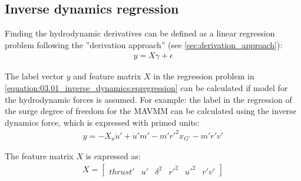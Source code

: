 \subsection{Inverse dynamics regression} \label{sec:IDR}
Finding the hydrodynamic derivatives can be defined as a linear regression problem following the ''derivation approach'' (see \autoref{sec:derivation_approach}):
\begin{equation}\label{equation:03.01_inverse_dynamics:eqregression}
\begin{split}y = X\gamma + \epsilon\end{split}
\end{equation}

\noindent The label vector \(y\) and feature matrix \(X\) in the regression problem in \autoref{equation:03.01_inverse_dynamics:eqregression} can be calculated if model for the hydrodynamic forces is assumed. For example: the label in the regression of the surge degree of freedom for the MAVMM can be calculated using the inverse dynamics force, which is expressed with primed units:
\begin{equation}\label{equation:03.01_inverse_dynamics:diff_eq_X_y}
\begin{split}\displaystyle y = - X_{\dot{u}} \dot{u}' + \dot{u}' m' - m' r'^{2} x_{G'} - m' r' v'\end{split}
\end{equation}

\noindent The feature matrix \(X\) is expressed as:
\begin{equation}\label{equation:03.01_inverse_dynamics:diff_eq_X_X}
\begin{split}\displaystyle X = \left[\begin{matrix}thrust' & u' & \delta^{2} & r'^{2} & u'^{2} & r' v'\end{matrix}\right]\end{split}
\end{equation}

